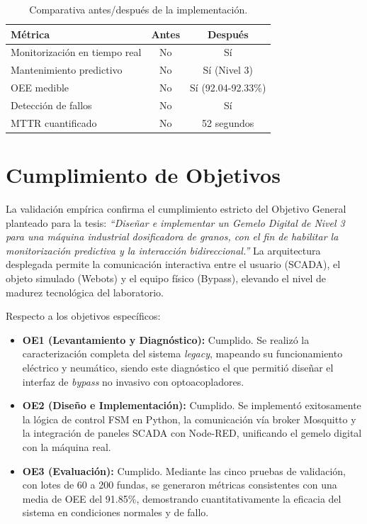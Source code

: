 \begin{table}[htbp]
\centering
\caption{Comparativa antes/después de la implementación.}
\label{tab:comparativa_inicial}
\begin{tabular}{|l|c|c|}
\hline
\textbf{Métrica} & \textbf{Antes} & \textbf{Después} \\
\hline
Monitorización en tiempo real & No & Sí \\
Mantenimiento predictivo & No & Sí (Nivel 3) \\
OEE medible & No & Sí (92.04-92.33\%) \\
Detección de fallos & No & Sí \\
MTTR cuantificado & No & 52 segundos \\
\hline
\end{tabular}
\end{table}

\section{Cumplimiento de Objetivos}

La validación empírica confirma el cumplimiento estricto del Objetivo General planteado para la tesis: \textit{“Diseñar e implementar un Gemelo Digital de Nivel 3 para una máquina industrial dosificadora de granos, con el fin de habilitar la monitorización predictiva y la interacción bidireccional.”} La arquitectura desplegada permite la comunicación interactiva entre el usuario (SCADA), el objeto simulado (Webots) y el equipo físico (Bypass), elevando el nivel de madurez tecnológica del laboratorio.

Respecto a los objetivos específicos:
\begin{itemize}
    \item \textbf{OE1 (Levantamiento y Diagnóstico):} Cumplido. Se realizó la caracterización completa del sistema \textit{legacy}, mapeando su funcionamiento eléctrico y neumático, siendo este diagnóstico el que permitió diseñar el interfaz de \textit{bypass} no invasivo con optoacopladores.
    \item \textbf{OE2 (Diseño e Implementación):} Cumplido. Se implementó exitosamente la lógica de control FSM en Python, la comunicación vía broker Mosquitto y la integración de paneles SCADA con Node-RED, unificando el gemelo digital con la máquina real.
    \item \textbf{OE3 (Evaluación):} Cumplido. Mediante las cinco pruebas de validación, con lotes de 60 a 200 fundas, se generaron métricas consistentes con una media de OEE del 91.85\%, demostrando cuantitativamente la eficacia del sistema en condiciones normales y de fallo.
\end{itemize}

